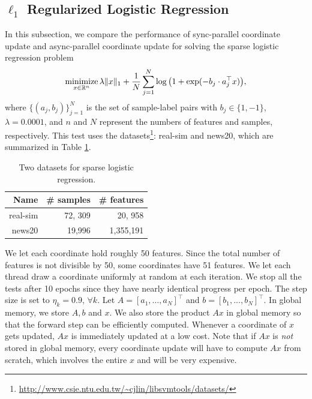 \subsection{$\ell_1$ Regularized Logistic Regression}
In this subsection, we compare the performance of sync-parallel coordinate update and  async-parallel coordinate update for solving the sparse logistic regression problem 
\begin{equation}\label{eqn:log}
\Min_{x \in \mathbb{R}^n} \lambda \|x\|_1 + \frac{1}{N} \sum_{j=1}^N \log\big(1 + \exp(-b_j \cdot a_j^{\top} x)\big),
\end{equation}
where $\{(a_j, b_j)\}_{j=1}^N$ is the set of sample-label pairs with $b_j \in \{1, -1\}$, $\lambda=0.0001$, and $n$ and $N$ represent the numbers of features and samples, respectively. This test uses the datasets\footnote{\url{http://www.csie.ntu.edu.tw/~cjlin/libsvmtools/datasets/}}: real-sim and news20, which are summarized in Table \ref{tab:log_data}.

\begin{table}[htbp]
\centering
 \begin{tabular}{rrr}
\hline
  Name & \# samples & \# features \\
  \hline
 real-sim & 72, 309 & 20, 958 \\
  news20 & 19,996 & 1,355,191\\
  \hline
 \end{tabular}
  \caption{\label{tab:log_data}Two  datasets for  sparse logistic regression.}
\end{table}

We let each coordinate hold roughly 50 features. {Since the total number of features is not divisible by 50, some coordinates have 51 features.} We let each thread draw a coordinate uniformly at random at each iteration. We stop all the tests after 10 epochs since they have nearly identical progress per epoch. %
The step size is set to $\eta_k=0.9,\,\forall k$. Let $A = [a_1, \ldots, a_N]^{\top}$ and $b = [b_1, ..., b_N]^{\top}$. In global memory, we store $A, b$ and $x$. We also store the product $Ax$ in global memory so that the forward step can be efficiently computed. Whenever a coordinate of $x$ gets updated, $Ax$ is immediately updated at a low cost. Note that if $Ax$ is \emph{not} stored in global memory, every coordinate update will have to compute $Ax$ from scratch, which involves the entire $x$ and will be very expensive.  %

